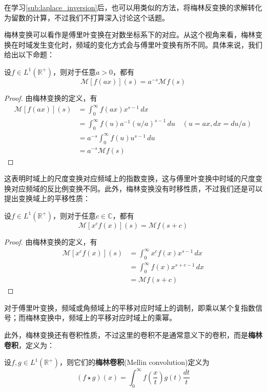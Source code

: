 在学习\ref{sub:laplace_inversion}后，也可以用类似的方法，将梅林反变换的求解转化为留数的计算，不过我们不打算深入讨论这个话题。

梅林变换可以看作是傅里叶变换在对数坐标系下的对应。从这个视角来看，梅林变换在时域发生变化时，频域的变化方式会与傅里叶变换有所不同。具体来说，我们给出以下命题：
\begin{proposition}[梅林变换的尺度变换性质]
    设$f\in L^1(\mathbb{R}^+)$，则对于任意$a>0$，都有
    \[\mathcal{M} [f(ax)](s)=a^{-s}\mathcal{M} f(s)\]
\end{proposition}
\begin{proof}
    由梅林变换的定义，有
    \begin{align*}
        \mathcal{M} [f(ax)](s)&=\int_0^{\infty}f(ax)x^{s-1}\,dx\\
        &=\int_0^{\infty}f(u)a^{-1}(u/a)^{s-1}\,du\quad (u=ax,dx=du/a)\\
        &=a^{-s}\int_0^{\infty}f(u)u^{s-1}\,du\\
        &=a^{-s}\mathcal{M} f(s)
    \end{align*}
\end{proof}

这表明时域上的尺度变换对应频域上的指数变换，这与傅里叶变换中时域的尺度变换对应频域的反比例变换不同。此外，梅林变换没有时移性质，不过我们还是可以提出变换域上的平移性质：

\begin{proposition}[梅林变换的乘幂性质]
    设$f\in L^1(\mathbb{R}^+)$，则对于任意$c\in\mathbb{C}$，都有
    \[\mathcal{M} [x^c f(x)](s)=\mathcal{M} f(s+c)\]
\end{proposition}
\begin{proof}
    由梅林变换的定义，有
    \begin{align*}
        \mathcal{M} [x^c f(x)](s)&=\int_0^{\infty}x^c f(x)x^{s-1}\,dx\\
        &=\int_0^{\infty}f(x)x^{s+c-1}\,dx\\
        &=\mathcal{M} f(s+c)
    \end{align*}
\end{proof}

对于傅里叶变换，频域或角频域上的平移对应时域上的调制，即乘以某个复指数信号；而梅林变换中，频域上的平移对应时域上的乘幂。

此外，梅林变换还有卷积性质，不过这里的卷积不是通常意义下的卷积，而是\textbf{梅林卷积}，定义为：
\begin{definition}[梅林卷积]
    设$f,g\in L^1(\mathbb{R}^+)$，则它们的\textbf{梅林卷积}(Mellin convolution)定义为
    \[(f\star g)(x)=\int_0^{\infty}f\left(\frac{x}{t}\right)g(t)\frac{dt}{t}\]
\end{definition}

